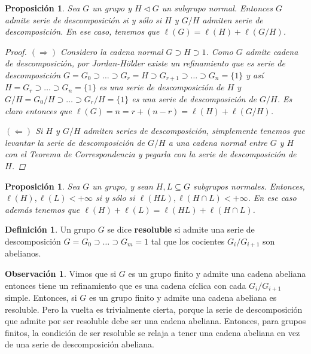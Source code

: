 \documentclass[12pt]{book}
\newtheorem{prop}[teo]{Proposición}
\theoremstyle{definition}
\newtheorem{obs}[teo]{Observación}
\newtheorem{defn}[teo]{Definición}
\begin{document}
\begin{prop}
Sea $G$ un grupo y $H\triangleleft G$ un subgrupo normal. Entonces $G$ admite serie de descomposición si y sólo si $H$ y $G/H$ admiten serie de descomposición. En ese caso, tenemos que $\ell(G)=\ell(H) + \ell(G/H)$.
\begin{proof}
$(\Longrightarrow)$ Considero la cadena normal $G\supset H\supset 1$. Como $G$ admite cadena de descomposición, por Jordan-Hölder existe un refinamiento que es serie de descomposición $G=G_0\supset\ldots\supset G_r = H \supset G_{r+1}\supset\ldots\supset G_n = \{1\}$ y así $H=G_r\supset\ldots\supset G_n=\{1\}$ es una serie de descomposición de $H$ y $G/H = G_0/H\supset\ldots\supset G_r/H=\{1\}$ es una serie de descomposición de $G/H$. Es claro entonces que $\ell(G) = n = r + (n-r) = \ell(H) + \ell(G/H)$.

$(\Longleftarrow)$ Si $H$ y $G/H$ admiten series de descomposición, simplemente tenemos que levantar la serie de descomposición de $G/H$ a una cadena normal entre $G$ y $H$ con el Teorema de Correspondencia y pegarla con la serie de descomposición de $H$.
\end{proof}
\end{prop}

\begin{prop}
Sea $G$ un grupo, y sean $H,L\subseteq G$ subgrupos normales. Entonces, $\ell(H),\ell(L)<+\infty$ si y sólo si $\ell(HL),\ell(H\cap L)<+\infty$. En ese caso además tenemos que $\ell(H)+\ell(L) = \ell(HL)+\ell(H\cap L)$.
\end{prop}

\begin{defn}
Un grupo $G$ se dice \textbf{resoluble} si admite una serie de descomposición $G=G_0\supset\ldots\supset G_m=1$ tal que los cocientes $G_i/G_{i+1}$ son abelianos.
\end{defn}

\begin{obs}
Vimos que si $G$ es un grupo finito y admite una cadena abeliana entonces tiene un refinamiento que es una cadena cíclica con cada $G_i/G_{i+1}$ simple. Entonces, si $G$ es un grupo finito y admite una cadena abeliana es resoluble. Pero la vuelta es trivialmente cierta, porque la serie de descomposición que admite por ser resoluble debe ser una cadena abeliana. Entonces, para grupos finitos, la condición de ser resoluble se relaja a tener una cadena abeliana en vez de una serie de descomposición abeliana.
\end{obs}
\end{document}

